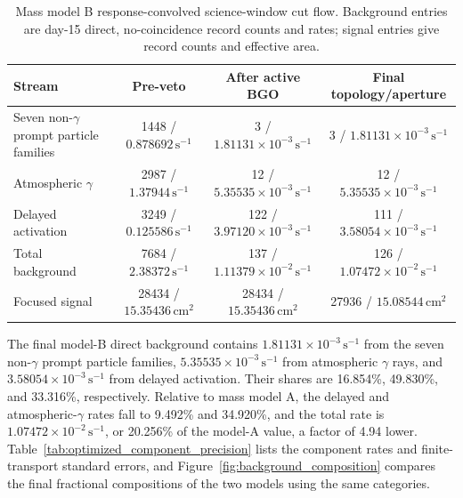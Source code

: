 \documentclass[11pt]{article}
\newcommand{\cps}{\ensuremath{\,\mathrm{s^{-1}}}}
\begin{document}
\begin{table}[H]
\centering
\caption{Mass model B response-convolved science-window cut flow. Background entries are day-15 direct, no-coincidence record counts and rates; signal entries give record counts and effective area.}
\label{tab:optimized_cutflow}
\footnotesize
\begin{tabular}{lccc}
\toprule
Stream & Pre-veto & After active BGO & Final topology/aperture \\
\midrule
Seven non-$\gamma$ prompt particle families & 1448 / $0.878692\cps$ & 3 / $1.81131\times10^{-3}\cps$ & 3 / $1.81131\times10^{-3}\cps$ \\
Atmospheric $\gamma$ & 2987 / $1.37944\cps$ & 12 / $5.35535\times10^{-3}\cps$ & 12 / $5.35535\times10^{-3}\cps$ \\
Delayed activation & 3249 / $0.125586\cps$ & 122 / $3.97120\times10^{-3}\cps$ & 111 / $3.58054\times10^{-3}\cps$ \\
Total background & 7684 / $2.38372\cps$ & 137 / $1.11379\times10^{-2}\cps$ & 126 / $1.07472\times10^{-2}\cps$ \\
Focused signal & 28434 / $15.35436\,\mathrm{cm^2}$ & 28434 / $15.35436\,\mathrm{cm^2}$ & 27936 / $15.08544\,\mathrm{cm^2}$ \\
\bottomrule
\end{tabular}
\end{table}

The final model-B direct background contains $1.81131\times10^{-3}\cps$ from
the seven non-$\gamma$ prompt particle families, $5.35535\times10^{-3}\cps$ from atmospheric
$\gamma$ rays, and $3.58054\times10^{-3}\cps$ from delayed
activation. Their shares are 16.854\%, 49.830\%, and 33.316\%, respectively.
Relative to mass model A, the delayed and atmospheric-$\gamma$ rates fall to
9.492\% and 34.920\%, and the total rate is $1.07472\times10^{-2}\cps$, or
20.256\% of the model-A value, a factor of 4.94 lower. Table~\ref{tab:optimized_component_precision}
lists the component rates and finite-transport standard errors, and
Figure~\ref{fig:background_composition} compares the final fractional
compositions of the two models using the same categories.
\end{document}
